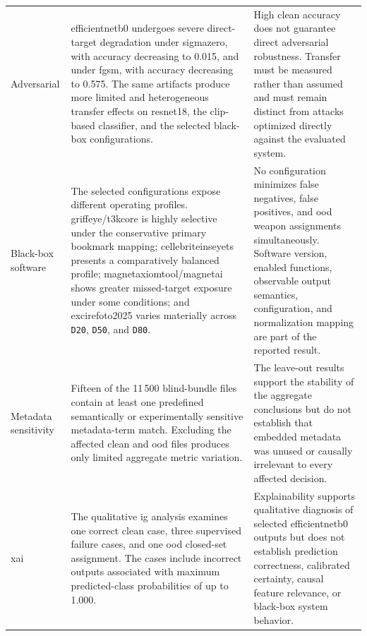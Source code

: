 \begin{longtable}{@{}L{0.15\textwidth} L{0.39\textwidth} L{0.39\textwidth}@{}}
Adversarial
&
\gls{efficientnetb0} undergoes severe direct-target degradation under
\gls{sigmazero}, with accuracy decreasing to 0.015, and under \gls{fgsm}, with
accuracy decreasing to 0.575. The same artifacts produce more limited and
heterogeneous transfer effects on \gls{resnet18}, the \gls{clip}-based classifier, and the
selected black-box configurations.
&
High clean accuracy does not guarantee direct adversarial robustness. Transfer
must be measured rather than assumed and must remain distinct from attacks
optimized directly against the evaluated system. \\

Black-box software
&
The selected configurations expose different operating profiles.
\gls{griffeye}/\gls{t3kcore} is highly selective under the conservative primary
bookmark mapping; \gls{cellebriteinseyets} presents a comparatively balanced
profile; \gls{magnetaxiomtool}/\gls{magnetai} shows greater missed-target
exposure under some conditions; and \gls{excirefoto2025} varies materially
across \texttt{D20}, \texttt{D50}, and \texttt{D80}.
&
No configuration minimizes false negatives, false positives, and \gls{ood}
weapon assignments simultaneously. Software version, enabled functions,
observable output semantics, configuration, and normalization mapping are part
of the reported result. \\

Metadata sensitivity
&
Fifteen of the 11\,500 blind-bundle files contain at least one predefined
semantically or experimentally sensitive metadata-term match. Excluding the
affected clean and \gls{ood} files produces only limited aggregate metric
variation.
&
The leave-out results support the stability of the aggregate conclusions but do
not establish that embedded metadata was unused or causally irrelevant to every
affected decision. \\

\gls{xai}
&
The qualitative \gls{ig} analysis examines one correct clean case, three
supervised failure cases, and one \gls{ood} closed-set assignment. The cases
include incorrect outputs associated with maximum predicted-class probabilities
of up to 1.000.
&
Explainability supports qualitative diagnosis of selected \gls{efficientnetb0} outputs
but does not establish prediction correctness, calibrated certainty, causal
feature relevance, or black-box system behavior. \\

\end{longtable}
\endgroup

